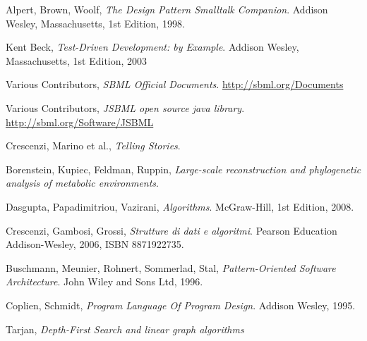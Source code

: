 \begin{thebibliography}{99}

  Alpert, Brown, Woolf,
  \emph{The Design Pattern Smalltalk Companion}.
  Addison Wesley, Massachusetts,
  1st Edition,
  1998.

  Kent Beck,
  \emph{Test-Driven Development: by Example}.
  Addison Wesley, Massachusetts,
  1st Edition,
  2003

  Various Contributors,
  \emph{SBML Official Documents}.
  \url{http://sbml.org/Documents}

 Various Contributors, \emph{JSBML open
    source java library}. \url{http://sbml.org/Software/JSBML}

  Crescenzi, Marino et al.,
  \emph{Telling Stories}.

 Borenstein, Kupiec, Feldman,
  Ruppin, \emph{Large-scale reconstruction and phylogenetic analysis
    of metabolic environments}.

  Dasgupta, Papadimitriou, Vazirani,
  \emph{Algorithms}.
  McGraw-Hill,
  1st Edition,
  2008.

  Crescenzi, Gambosi, Grossi,
  \emph{Strutture di dati e algoritmi}.
  Pearson Education Addison-Wesley, 2006, ISBN 8871922735.

  Buschmann, Meunier, Rohnert, Sommerlad, Stal, 
  \emph{Pattern-Oriented Software Architecture}.
  John Wiley and Sons Ltd, 1996.

  Coplien, Schmidt,
  \emph{Program Language Of Program Design}.
  Addison Wesley, 1995.

  Tarjan,
  \emph{Depth-First Search and linear graph algorithms}

\end{thebibliography}